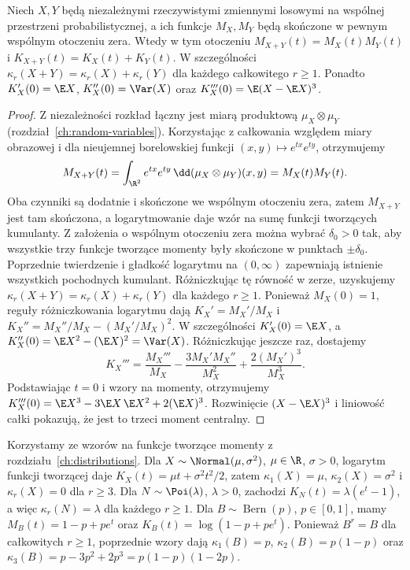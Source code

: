 \begin{twierdzenie}
Niech $X,Y$ będą niezależnymi rzeczywistymi zmiennymi losowymi
na wspólnej przestrzeni probabilistycznej, a ich funkcje $M_X,M_Y$ będą skończone w pewnym wspólnym
otoczeniu zera. Wtedy w tym otoczeniu
$M_{X+Y}(t)=M_X(t)M_Y(t)$ i
$K_{X+Y}(t)=K_X(t)+K_Y(t)$.
W szczególności $\kappa_r(X+Y)=\kappa_r(X)+\kappa_r(Y)$
dla każdego całkowitego $r\geq1$.
Ponadto $K_X'(0)=\E X$, $K_X''(0)=\Var(X)$
oraz $K_X'''(0)=\E(X-\E X)^3$.
\end{twierdzenie}
\begin{proof}
Z niezależności rozkład łączny jest miarą produktową
$\mu_X\otimes\mu_Y$ (rozdział~\ref{ch:random-variables}).
Korzystając z całkowania względem miary obrazowej i
dla nieujemnej borelowskiej funkcji $(x,y)\mapsto e^{tx}e^{ty}$,
otrzymujemy
\[
M_{X+Y}(t)=\int_{\R^2}e^{tx}e^{ty}\,
\dd(\mu_X\otimes\mu_Y)(x,y)
=M_X(t)M_Y(t).
\]
Oba czynniki są dodatnie i skończone we wspólnym otoczeniu
zera, zatem $M_{X+Y}$ jest tam skończona, a logarytmowanie
daje wzór na sumę funkcji tworzących kumulanty.
Z założenia o wspólnym otoczeniu zera można wybrać
$\delta_0>0$ tak, aby wszystkie trzy funkcje tworzące
momenty były skończone w punktach $\pm\delta_0$.
Poprzednie twierdzenie i gładkość logarytmu na $(0,\infty)$
zapewniają istnienie wszystkich pochodnych kumulant.
Różniczkując tę równość w zerze, uzyskujemy
$\kappa_r(X+Y)=\kappa_r(X)+\kappa_r(Y)$ dla każdego $r\geq1$. Ponieważ $M_X(0)=1$, reguły
różniczkowania logarytmu dają
$K_X'=M_X'/M_X$ i
$K_X''=M_X''/M_X-(M_X'/M_X)^2$.
W szczególności $K_X'(0)=\E X$, a
$K_X''(0)=\E X^2-(\E X)^2=\Var(X)$.
Różniczkując jeszcze raz, dostajemy
\[
K_X'''=\frac{M_X'''}{M_X}
-\frac{3M_X'M_X''}{M_X^2}
+\frac{2(M_X')^3}{M_X^3}.
\]
Podstawiając $t=0$ i wzory na momenty, otrzymujemy
$K_X'''(0)=\E X^3-3\E X\,\E X^2+2(\E X)^3$.
Rozwinięcie $(X-\E X)^3$ i liniowość całki pokazują,
że jest to trzeci moment centralny.
\end{proof}

\begin{przyklad}
Korzystamy ze wzorów na funkcje tworzące momenty
z rozdziału~\ref{ch:distributions}.
Dla $X\sim\Normal(\mu,\sigma^2)$, $\mu\in\R$, $\sigma>0$,
logarytm funkcji tworzącej daje
$K_X(t)=\mu t+\sigma^2t^2/2$, zatem
$\kappa_1(X)=\mu$, $\kappa_2(X)=\sigma^2$
i $\kappa_r(X)=0$ dla $r\geq3$.
Dla $N\sim\Poi(\lambda)$, $\lambda>0$, zachodzi
$K_N(t)=\lambda(e^t-1)$, a więc
$\kappa_r(N)=\lambda$ dla każdego $r\geq1$.
Dla $B\sim\operatorname{Bern}(p)$, $p\in[0,1]$,
mamy $M_B(t)=1-p+pe^t$ oraz $K_B(t)=\log(1-p+pe^t)$.
Ponieważ $B^r=B$ dla całkowitych $r\geq1$, poprzednie
wzory dają $\kappa_1(B)=p$, $\kappa_2(B)=p(1-p)$
oraz $\kappa_3(B)=p-3p^2+2p^3=p(1-p)(1-2p)$.
\end{przyklad}

